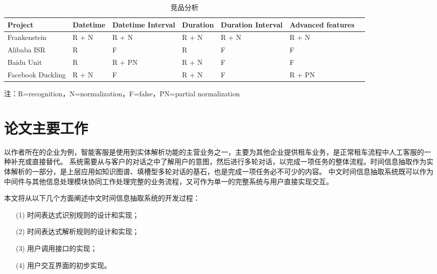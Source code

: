 \begin{table}[h]
    \centering
    \caption{竞品分析}
    \begin{tabularx}{\linewidth}{*{7}{Y}}
        \toprule
        Project           & Datetime & Datetime Interval & Duration & Duration Interval & Advanced features \\
        \midrule
        Frankenstein      & R + N    & R + N             & R + N    & R + N             & R + N             \\
        Alibaba ISR       & R        & F                 & R        & F                 & F                 \\
        Baidu Unit        & R        & R + PN            & R + N    & F                 & F                 \\
        Facebook Duckling & R + N    & F                 & R + N    & F                 & R + PN            \\
        \bottomrule
    \end{tabularx}
    \begin{tablenotes}
        \footnotesize
        \item 注：R=recognition，N=normalization，F=false，PN=partial normalization
    \end{tablenotes}
    \label{tab:product_analysis}
\end{table}


\section{论文主要工作}

以作者所在的企业为例，智能客服是使用到实体解析功能的主营业务之一，主要为其他企业提供租车业务，是正常租车流程中人工客服的一种补充或直接替代。
系统需要从与客户的对话之中了解用户的意图，然后进行多轮对话，以完成一项任务的整体流程。时间信息抽取作为实体解析的一部分，是上层应用如知识图谱、填槽型多轮对话的基石，也是完成一项任务必不可少的内容。
中文时间信息抽取系统既可以作为中间件与其他信息处理模块协同工作处理完整的业务流程，又可作为单一的完整系统与用户直接实现交互。

本文将从以下几个方面阐述中文时间信息抽取系统的开发过程：
\begin{enumerate}
    \item[(1)] 时间表达式识别规则的设计和实现；
    \item[(2)] 时间表达式解析规则的设计和实现；
    \item[(3)] 用户调用接口的实现；
    \item[(4)] 用户交互界面的初步实现。
\end{enumerate}

